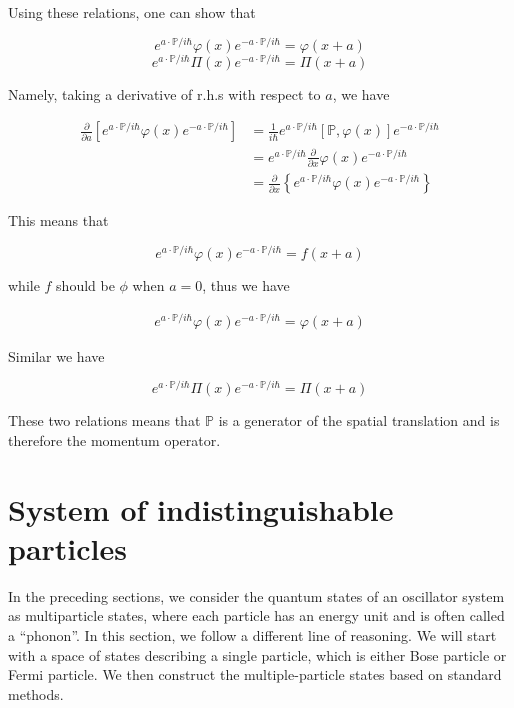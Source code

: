 Using these relations, one can show that 

\[e^{a\cdot\mathbb{P}/i\hbar}\varphi(x)e^{-a\cdot\mathbb{P}/i\hbar} = \varphi(x+a) \]
\[e^{a\cdot\mathbb{P}/i\hbar}\Pi(x)e^{-a\cdot\mathbb{P}/i\hbar} = \Pi(x+a) \]

Namely, taking a derivative of r.h.s with respect to $a$, we have

\[\begin{split}
\frac{\partial}{\partial a}\left[e^{a\cdot\mathbb{P}/i\hbar}\varphi(x)e^{-a\cdot\mathbb{P}/i\hbar}\right]&=\frac{1}{i\hbar}e^{a\cdot\mathbb{P}/i\hbar}[\mathbb{P},\varphi(x)]e^{-a\cdot\mathbb{P}/i\hbar}\\
&= e^{a\cdot\mathbb{P}/i\hbar}\frac{\partial}{\partial x}\varphi(x)e^{-a\cdot\mathbb{P}/i\hbar}\\
&=\frac{\partial}{\partial x}\left\{e^{a\cdot\mathbb{P}/i\hbar}\varphi(x)e^{-a\cdot\mathbb{P}/i\hbar}\right\}
\end{split}\]

This means that

\[e^{a\cdot\mathbb{P}/i\hbar}\varphi(x)e^{-a\cdot\mathbb{P}/i\hbar} = f(x+a) \]

while $f$ should be $\phi$ when $a=0$, thus we have

\begin{align}
e^{a\cdot\mathbb{P}/i\hbar}\varphi(x)e^{-a\cdot\mathbb{P}/i\hbar} = \varphi(x+a)
\end{align}

Similar we have

\[e^{a\cdot\mathbb{P}/i\hbar}\Pi(x)e^{-a\cdot\mathbb{P}/i\hbar} = \Pi(x+a)
\]

These two relations means that $\mathbb{P}$ is a generator of the spatial translation and is therefore the momentum operator. 


\section{System of indistinguishable particles}

In the preceding sections, we consider the quantum states of an oscillator  system as multiparticle states, where each particle has an energy unit and is often called a ``phonon''. In this section, we follow a different line of reasoning. We will start with a space of states describing a single particle, which is either Bose particle or Fermi particle. We then construct the multiple-particle states based on standard methods. 

